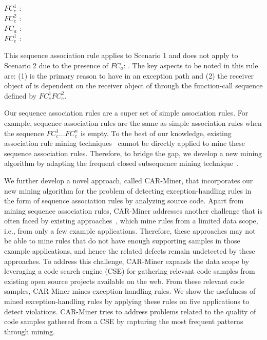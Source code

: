 $FC_c^1$ : \\
\hspace*{0.15in}$FC_c^2$ : \\
\hspace*{0.15in}$FC_a$ : \\
\hspace*{0.15in}$FC_e^1$ : \\
\vspace*{-2ex}

This sequence association rule applies to Scenario 1 and
does not apply to Scenario 2 due to the presence of $FC_a$: .
The key aspects to be noted in this rule are: (1) 
is the primary reason to have  in an exception path and
(2) the receiver object of  is dependent on the 
receiver object of  through the function-call sequence
defined by $FC_c^1$$FC_c^2$.

Our sequence association rules are a super set of simple association rules.
For example, sequence association rules are the same as simple association
rules when the sequence $FC_c^1$...$FC_c^n$ is empty. 
To the best of our knowledge, existing association rule mining techniques~\cite{agarwal:association}
cannot be directly applied to mine these sequence association rules. 
Therefore, to bridge the gap, we develop a new mining algorithm by adapting the
frequent closed subsequence mining technique~\cite{wang:bide}. 

We further develop a novel approach, called CAR-Miner, that incorporates
our new mining algorithm for the problem of detecting exception-handling rules in
the form of sequence association rules by analyzing source code. Apart from mining sequence
association rules, CAR-Miner addresses another challenge that is often faced 
by existing approaches~\cite{Zhenmin2005PRMiner, chang07:finding, WeimerN05}, 
which mine rules from a limited data scope, 
i.e., from only a few example applications. Therefore, these approaches may not 
be able to mine rules that do not have enough
supporting samples in those example applications, and hence 
the related defects remain undetected by these approaches. To address
this challenge, CAR-Miner expands the data scope by leveraging a code search engine (CSE)
for gathering relevant code samples from existing open source projects available
on the web. From these relevant code samples, CAR-Miner mines exception-handling rules. 
We show the usefulness of mined exception-handling rules
by applying these rules on five applications to detect violations.
CAR-Miner tries to address problems related to the quality of code samples 
gathered from a CSE by capturing the most frequent patterns through mining.


